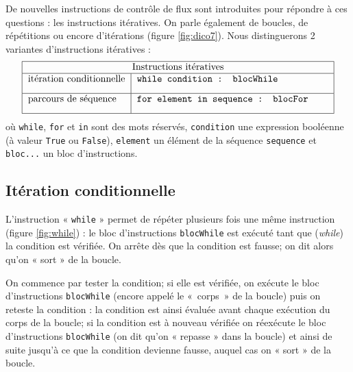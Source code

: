 De nouvelles instructions de contrôle de flux sont introduites pour répondre
à ces questions : les instructions itératives. On parle également de boucles, de répétitions
ou encore d'itérations (figure \ref{fig:dico7}).
Nous distinguerons 2 variantes d'instructions itératives :
$$\begin{tabular}{|l|l|}
\hline
\multicolumn{2}{|c|}{Instructions itératives}\\
\hline
itération conditionnelle & {\begin{minipage}[t]{6cm}\tt while condition : blocWhile \\ \mbox{} \end{minipage}} \\
\hline
parcours de séquence & {\begin{minipage}[t]{7cm}\tt for element in sequence : blocFor \\ \mbox{} \end{minipage}} \\
\hline
\end{tabular}$$
où {\tt while}, {\tt for} et {\tt in} sont des mots réservés, {\tt condition} une expression
booléenne (à valeur {\tt True} ou {\tt False}), {\tt element} un élément de la séquence {\tt sequence}
et {\tt bloc...} un bloc d'instructions.


\subsection{Itération conditionnelle}
L'instruction « {\tt while} »  permet de répéter plusieurs fois une même instruction 
(figure \ref{fig:while}) : le bloc d'instructions {\tt blocWhile} est exécuté tant que
({\em while}) la condition est vérifiée. On arrête dès que la condition est fausse; 
on dit alors qu'on « sort » de la boucle. 

On commence par tester la condition; si elle
est vérifiée, on exécute le bloc d'instructions {\tt blocWhile} 
(encore appelé le «~corps~» de la boucle) puis on reteste la condition : 
la condition est ainsi évaluée avant chaque exécution du corps 
de la boucle; si la condition est à nouveau vérifiée on réexécute le bloc 
d'instructions {\tt blocWhile} (on dit qu'on « repasse » dans la boucle)
et ainsi de suite jusqu'à ce que la condition devienne fausse, 
auquel cas on « sort » de la boucle.

